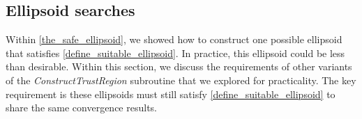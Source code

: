 %
%
%
%
%

% 

\subsection{Ellipsoid searches}

Within \cref{the_safe_ellipsoid}, we showed how to construct one possible ellipsoid that satisfies \cref{define_suitable_ellipsoid}.
In practice, this ellipsoid could be less than desirable.
Within this section, we discuss the requirements of other variants of the \emph{ConstructTrustRegion} subroutine that we explored for practicality.
The key requirement is these ellipsoids must still satisfy \cref{define_suitable_ellipsoid} to share the same convergence results.

